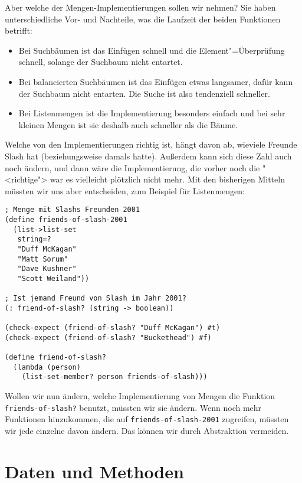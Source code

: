 Aber welche der Mengen-Implementierungen sollen wir nehmen?  Sie haben
unterschiedliche Vor- und Nachteile, was die Laufzeit der beiden
Funktionen betrifft:
%
\begin{itemize}
\item Bei Suchbäumen ist das Einfügen schnell und die
  Element"=Überprüfung schnell, solange der Suchbaum nicht entartet.
\item Bei balancierten Suchbäumen ist das Einfügen etwas langsamer,
  dafür kann der Suchbaum nicht entarten.  Die Suche ist also
  tendenziell schneller.
\item Bei Listenmengen ist die Implementierung besonders einfach und
  bei sehr kleinen Mengen ist sie deshalb auch schneller als die
  Bäume.
\end{itemize}
%
Welche von den Implementierungen richtig ist, hängt davon ab, wieviele
Freunde Slash hat (beziehungsweise damals hatte).  Außerdem kann sich
diese Zahl auch noch ändern, und dann wäre die Implementierung, die
vorher noch die "<richtige"> war es vielleicht plötzlich nicht mehr.
Mit den bisherigen Mitteln müssten wir uns aber entscheiden, zum
Beispiel für Listenmengen:
%
\begin{lstlisting}
; Menge mit Slashs Freunden 2001
(define friends-of-slash-2001
  (list->list-set
   string=?
   "Duff McKagan"
   "Matt Sorum"
   "Dave Kushner"
   "Scott Weiland"))

; Ist jemand Freund von Slash im Jahr 2001?
(: friend-of-slash? (string -> boolean))

(check-expect (friend-of-slash? "Duff McKagan") #t)
(check-expect (friend-of-slash? "Buckethead") #f)

(define friend-of-slash?
  (lambda (person)
    (list-set-member? person friends-of-slash)))
\end{lstlisting}
%
Wollen wir nun ändern, welche Implementierung von Mengen die Funktion
\lstinline{friends-of-slash?}  benutzt, müssten wir sie ändern.  Wenn
noch mehr Funktionen hinzukommen, die auf
\lstinline{friends-of-slash-2001} zugreifen, müssten wir jede einzelne
davon ändern.  Das können wir durch Abstraktion vermeiden.

\section{Daten und Methoden}



